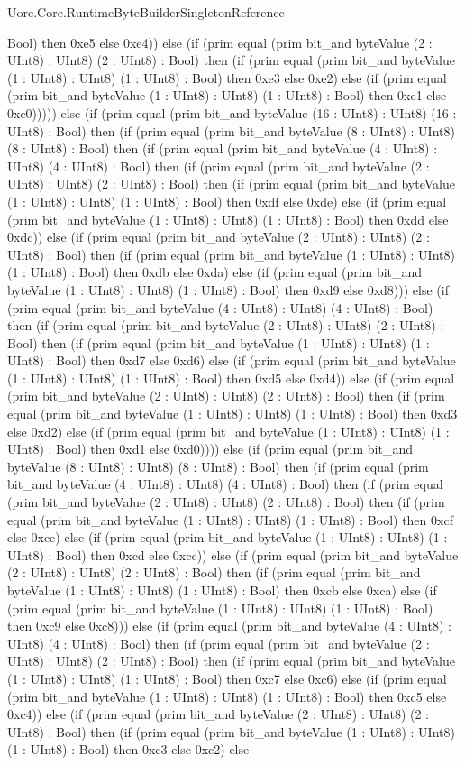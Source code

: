 \begin{lexlean}{Uorc.Core.RuntimeByteBuilderSingletonReference}
\begin{semanticmodule}
{Bool) then 0xe5 else 0xe4)) else (if (prim equal (prim bit_and byteValue (2 : UInt8) : UInt8) (2 : UInt8) : Bool) then (if (prim equal (prim bit_and byteValue (1 : UInt8) : UInt8) (1 : UInt8) : Bool) then 0xe3 else 0xe2) else (if (prim equal (prim bit_and byteValue (1 : UInt8) : UInt8) (1 : UInt8) : Bool) then 0xe1 else 0xe0))))) else (if (prim equal (prim bit_and byteValue (16 : UInt8) : UInt8) (16 : UInt8) : Bool) then (if (prim equal (prim bit_and byteValue (8 : UInt8) : UInt8) (8 : UInt8) : Bool) then (if (prim equal (prim bit_and byteValue (4 : UInt8) : UInt8) (4 : UInt8) : Bool) then (if (prim equal (prim bit_and byteValue (2 : UInt8) : UInt8) (2 : UInt8) : Bool) then (if (prim equal (prim bit_and byteValue (1 : UInt8) : UInt8) (1 : UInt8) : Bool) then 0xdf else 0xde) else (if (prim equal (prim bit_and byteValue (1 : UInt8) : UInt8) (1 : UInt8) : Bool) then 0xdd else 0xdc)) else (if (prim equal (prim bit_and byteValue (2 : UInt8) : UInt8) (2 : UInt8) : Bool) then (if (prim equal (prim bit_and byteValue (1 : UInt8) : UInt8) (1 : UInt8) : Bool) then 0xdb else 0xda) else (if (prim equal (prim bit_and byteValue (1 : UInt8) : UInt8) (1 : UInt8) : Bool) then 0xd9 else 0xd8))) else (if (prim equal (prim bit_and byteValue (4 : UInt8) : UInt8) (4 : UInt8) : Bool) then (if (prim equal (prim bit_and byteValue (2 : UInt8) : UInt8) (2 : UInt8) : Bool) then (if (prim equal (prim bit_and byteValue (1 : UInt8) : UInt8) (1 : UInt8) : Bool) then 0xd7 else 0xd6) else (if (prim equal (prim bit_and byteValue (1 : UInt8) : UInt8) (1 : UInt8) : Bool) then 0xd5 else 0xd4)) else (if (prim equal (prim bit_and byteValue (2 : UInt8) : UInt8) (2 : UInt8) : Bool) then (if (prim equal (prim bit_and byteValue (1 : UInt8) : UInt8) (1 : UInt8) : Bool) then 0xd3 else 0xd2) else (if (prim equal (prim bit_and byteValue (1 : UInt8) : UInt8) (1 : UInt8) : Bool) then 0xd1 else 0xd0)))) else (if (prim equal (prim bit_and byteValue (8 : UInt8) : UInt8) (8 : UInt8) : Bool) then (if (prim equal (prim bit_and byteValue (4 : UInt8) : UInt8) (4 : UInt8) : Bool) then (if (prim equal (prim bit_and byteValue (2 : UInt8) : UInt8) (2 : UInt8) : Bool) then (if (prim equal (prim bit_and byteValue (1 : UInt8) : UInt8) (1 : UInt8) : Bool) then 0xcf else 0xce) else (if (prim equal (prim bit_and byteValue (1 : UInt8) : UInt8) (1 : UInt8) : Bool) then 0xcd else 0xcc)) else (if (prim equal (prim bit_and byteValue (2 : UInt8) : UInt8) (2 : UInt8) : Bool) then (if (prim equal (prim bit_and byteValue (1 : UInt8) : UInt8) (1 : UInt8) : Bool) then 0xcb else 0xca) else (if (prim equal (prim bit_and byteValue (1 : UInt8) : UInt8) (1 : UInt8) : Bool) then 0xc9 else 0xc8))) else (if (prim equal (prim bit_and byteValue (4 : UInt8) : UInt8) (4 : UInt8) : Bool) then (if (prim equal (prim bit_and byteValue (2 : UInt8) : UInt8) (2 : UInt8) : Bool) then (if (prim equal (prim bit_and byteValue (1 : UInt8) : UInt8) (1 : UInt8) : Bool) then 0xc7 else 0xc6) else (if (prim equal (prim bit_and byteValue (1 : UInt8) : UInt8) (1 : UInt8) : Bool) then 0xc5 else 0xc4)) else (if (prim equal (prim bit_and byteValue (2 : UInt8) : UInt8) (2 : UInt8) : Bool) then (if (prim equal (prim bit_and byteValue (1 : UInt8) : UInt8) (1 : UInt8) : Bool) then 0xc3 else 0xc2) else }
\end{semanticmodule}
\end{lexlean}
